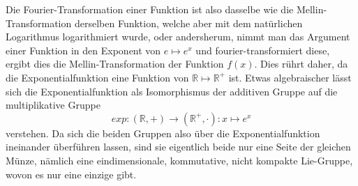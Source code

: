 Die Fourier-Transformation einer Funktion ist also dasselbe wie die 
Mellin-Transformation derselben Funktion, welche aber mit dem 
natürlichen Logarithmus logarithmiert wurde, oder andersherum, 
nimmt man das Argument einer Funktion in den Exponent von 
$e \mapsto e^x$ und fourier-transformiert diese, ergibt dies die 
Mellin-Transformation der Funktion $f(x)$.
Dies rührt daher, da die Exponentialfunktion eine Funktion von 
$\mathbb{R} \mapsto \mathbb{R^+}$ ist.
Etwas algebraischer lässt sich die Exponentialfunktion als 
Isomorphismus der additiven Gruppe auf die multiplikative Gruppe 
\[
exp : (\mathbb{R},+) \to (\mathbb{R^+},\cdot):x \mapsto e^x
\]
verstehen. 
Da sich die beiden Gruppen also über die Exponentialfunktion 
ineinander überführen lassen, sind sie eigentlich beide nur eine Seite 
der gleichen Münze, nämlich eine eindimensionale, kommutative, nicht 
kompakte Lie-Gruppe, wovon es nur eine einzige gibt.
\medskip

